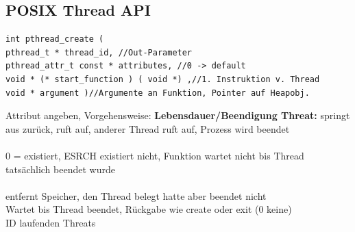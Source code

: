 \subsection{POSIX Thread API}
\begin{verbatim}
int pthread_create (
pthread_t * thread_id, //Out-Parameter
pthread_attr_t const * attributes, //0 -> default
void * (* start_function ) ( void *) ,//1. Instruktion v. Thread
void * argument )//Argumente an Funktion, Pointer auf Heapobj.
\end{verbatim}
Attribut angeben, Vorgehensweise:
\textbf{Lebensdauer/Beendigung Threat: }springt aus  zurück, ruft  auf, anderer Thread ruft  auf, Prozess wird beendet\\
\\
 0 = existiert, ESRCH existiert nicht, Funktion wartet nicht bis Thread tatsächlich beendet wurde\\
\\
entfernt Speicher, den Thread belegt hatte aber beendet nicht\\
Wartet bis Thread beendet, Rückgabe wie create oder exit (0 keine)\\
 ID laufenden Threats


